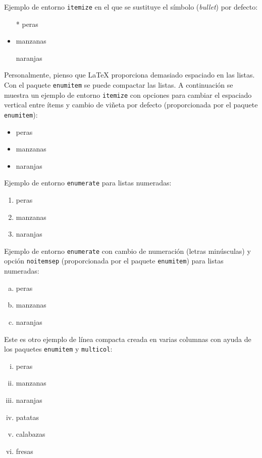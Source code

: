 \documentclass[11pt,a4paper]{article}
\begin{document}
\noindent Ejemplo de entorno {\tt itemize} en el que se sustituye el símbolo (\emph{bullet}) por defecto:

\begin{itemize}
	\item[*] peras
	\item manzanas
	\item[\ding{170}] naranjas
\end{itemize}


Personalmente, pienso que \LaTeX{} proporciona demasiado espaciado en las listas. Con el paquete \texttt{enumitem} se puede compactar las listas. A continuación se muestra un ejemplo de entorno {\tt itemize} con opciones para cambiar el espaciado vertical entre ítems y cambio de viñeta por defecto (proporcionada por el paquete \texttt{enumitem}):

\begin{itemize}[noitemsep]
	\item peras
	\item manzanas
	\item naranjas
\end{itemize}

\noindent Ejemplo de entorno {\tt enumerate} para listas numeradas:

\begin{enumerate}
	\item peras
	\item manzanas
	\item naranjas
\end{enumerate}


\noindent Ejemplo de entorno {\tt enumerate} con cambio de numeración (letras minúsculas) y opción \texttt{noitemsep} (proporcionada por el paquete \texttt{enumitem}) para listas numeradas:

\begin{enumerate}[a.-,noitemsep]
	\item peras
	\item manzanas
	\item naranjas
\end{enumerate}

\noindent Este es otro ejemplo de línea compacta creada en varias columnas con ayuda de los paquetes \texttt{enumitem} y \texttt{multicol}:
\begin{multicols}{2} %
	\begin{enumerate}[i.,noitemsep]
		\item peras
		\item manzanas
		\item naranjas
		\item patatas
		\item calabazas
		\item fresas
	\end{enumerate}
\end{multicols}
\end{document}
